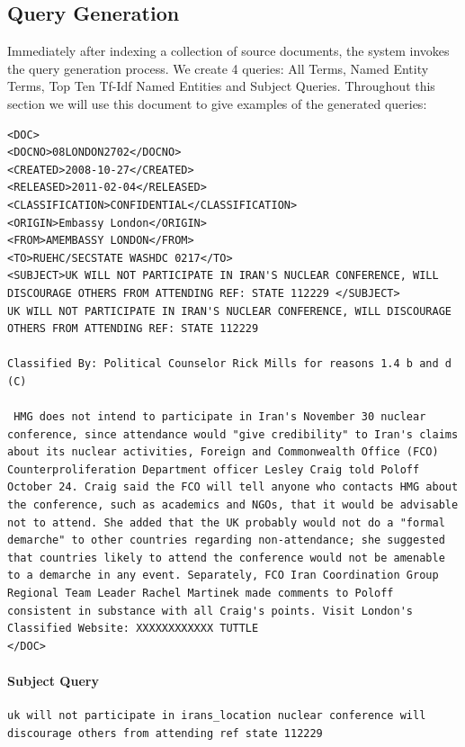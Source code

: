 \documentclass{l4proj}
\begin{document}
\subsection{Query Generation} \label{querygen}
Immediately after indexing a collection of source documents, the system invokes the query generation process. We create 4 queries: All Terms, Named Entity Terms, Top Ten Tf-Idf Named Entities and Subject Queries.
Throughout this section we will use this document to give examples of the generated queries:
\begin{verbatim}
<DOC>
<DOCNO>08LONDON2702</DOCNO>
<CREATED>2008-10-27</CREATED>
<RELEASED>2011-02-04</RELEASED>
<CLASSIFICATION>CONFIDENTIAL</CLASSIFICATION>
<ORIGIN>Embassy London</ORIGIN>
<FROM>AMEMBASSY LONDON</FROM>
<TO>RUEHC/SECSTATE WASHDC 0217</TO>
<SUBJECT>UK WILL NOT PARTICIPATE IN IRAN'S NUCLEAR CONFERENCE, WILL DISCOURAGE OTHERS FROM ATTENDING REF: STATE 112229 </SUBJECT>
UK WILL NOT PARTICIPATE IN IRAN'S NUCLEAR CONFERENCE, WILL DISCOURAGE OTHERS FROM ATTENDING REF: STATE 112229

Classified By: Political Counselor Rick Mills for reasons 1.4 b and d (C)

 HMG does not intend to participate in Iran's November 30 nuclear conference, since attendance would "give credibility" to Iran's claims about its nuclear activities, Foreign and Commonwealth Office (FCO) Counterproliferation Department officer Lesley Craig told Poloff October 24. Craig said the FCO will tell anyone who contacts HMG about the conference, such as academics and NGOs, that it would be advisable not to attend. She added that the UK probably would not do a "formal demarche" to other countries regarding non-attendance; she suggested that countries likely to attend the conference would not be amenable to a demarche in any event. Separately, FCO Iran Coordination Group Regional Team Leader Rachel Martinek made comments to Poloff consistent in substance with all Craig's points. Visit London's Classified Website: XXXXXXXXXXXX TUTTLE
</DOC>
\end{verbatim}
\paragraph{Subject Query}
\begin{verbatim}
uk will not participate in irans_location nuclear conference will discourage others from attending ref state 112229
\end{verbatim}
\end{document}
